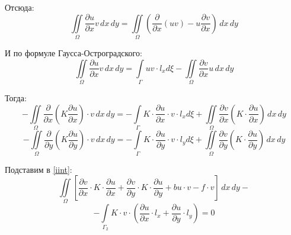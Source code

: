 \documentclass{bmstu}
\begin{document}
	Отсюда:
	\[\iint\limits_{\Omega} \frac{\partial u}{\partial x} v \, dx \, dy = \iint\limits_{\Omega} \left( \frac{\partial}{\partial x} (uv) - u \frac{\partial v}{\partial x} \right) \, dx \, dy\]
	
	И по формуле Гаусса-Остроградского:
	\[\iint\limits_{\Omega} \frac{\partial u}{\partial x} v \, dx \, dy = \int \limits_{\Gamma} uv \cdot l_x d \xi - \iint\limits_{\Omega} \frac{\partial v}{\partial x} u \, dx \, dy\]
	
	Тогда:
	\[-\iint\limits_{\Omega} \frac{\partial}{\partial x} \left( K \frac{\partial u}{\partial x} \right) \cdot v \, dx \, dy = 
	-\int \limits_{\Gamma} K \cdot \frac{\partial u}{\partial x} \cdot v \cdot l_x d \xi + \iint\limits_{\Omega} \frac{\partial v}{\partial x} \left(  K \cdot \frac{\partial u}{\partial x} \right) \, dx \, dy\]
	\[-\iint\limits_{\Omega} \frac{\partial}{\partial y} \left( K \frac{\partial u}{\partial y} \right) \cdot v \, dx \, dy = 
	-\int \limits_{\Gamma} K \cdot \frac{\partial u}{\partial y} \cdot v \cdot l_y d \xi + \iint\limits_{\Omega} \frac{\partial v}{\partial y} \left(  K \cdot \frac{\partial u}{\partial y} \right) \, dx \, dy\]
	
	Подставим в \eqref{iint}:
	\[\iint\limits_{\Omega} \left [ \frac{\partial v}{\partial x} \cdot K \cdot \frac{\partial u}{\partial x} + \frac{\partial v}{\partial y} \cdot K \cdot \frac{\partial u}{\partial y} + bu \cdot v - f  \cdot v \right ] \, dx \, dy -\]
	\[-\int \limits_{\Gamma_2} K \cdot v \cdot \left(\frac{\partial u}{\partial x} \cdot l_x + \frac{\partial u}{\partial y} \cdot l_y \right) = 0\]
\end{document}
